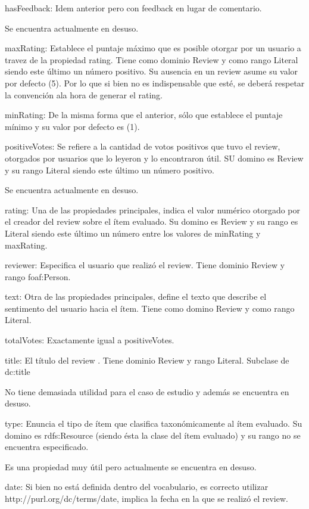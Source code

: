 hasFeedback: Idem anterior pero con feedback en lugar de comentario.

Se encuentra actualmente en desuso.


maxRating: Establece el puntaje máximo que es posible otorgar por un usuario a travez de la propiedad rating. Tiene como dominio 
Review y como rango Literal siendo este último un número positivo. Su ausencia en un review asume su valor por defecto (5). Por lo que 
si bien no es indispensable que esté, se deberá respetar la convención ala hora de generar el rating.



minRating: De la misma forma que el anterior, sólo que establece el puntaje mínimo y su valor por defecto es (1).


positiveVotes: Se refiere a la cantidad de votos positivos que tuvo el review, otorgados por usuarios que lo leyeron y lo encontraron 
útil. SU domino es Review y su rango Literal siendo este último un número positivo.


Se encuentra actualmente en desuso.


rating: Una de las propiedades principales, indica el valor numérico otorgado por el creador del review sobre el ítem evaluado. 
Su domino es Review y su rango es Literal siendo este último un número entre los valores de minRating y maxRating.


reviewer: Especifica el usuario que realizó el review. Tiene dominio Review y rango foaf:Person. 



text: Otra de las propiedades principales, define el texto que describe el sentimento del usuario hacia el ítem. Tiene como 
domino Review y como rango Literal.


totalVotes: Exactamente igual a positiveVotes.


title: El título del review . Tiene dominio Review y rango Literal. Subclase de dc:title


No tiene demasiada utilidad para el caso de estudio y además se encuentra en desuso.


type: Enuncia el tipo de ítem que clasifica taxonómicamente al ítem evaluado. Su domino es rdfs:Resource (siendo ésta la clase del ítem evaluado)  
y su rango no se encuentra especificado. 


Es una propiedad muy útil pero actualmente se encuentra en desuso.


date: Si bien no está definida dentro del vocabulario, es correcto utilizar http://purl.org/dc/terms/date, implica la fecha en la 
que se realizó el review.


